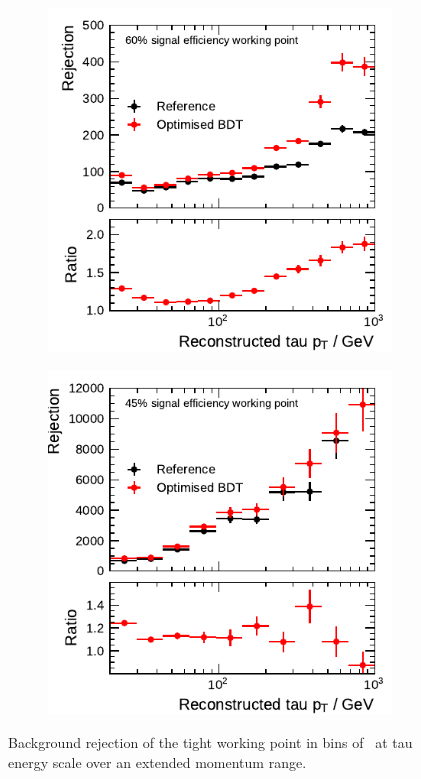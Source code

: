 \begin{figure}[htbp]
  \centering
  \begin{subfigure}[t]{0.48\textwidth}
    \centering
    \includegraphics{./figures/bdt_perf/post_optimisation/1p_highpt/rejection_tight_ratio_highpt.pdf}
  \end{subfigure}\hfill
  \begin{subfigure}[t]{0.48\textwidth}
    \centering
    \includegraphics{./figures/bdt_perf/post_optimisation/3p_highpt/rejection_tight_ratio_highpt.pdf}
  \end{subfigure}
  \caption[Background rejection of the tight working point in bins of
  \tauhadvis~\pt for the BDT-based identification after optimisation (extended
  \tauhadvis~\pt range)]{Background rejection of the tight working point in bins
    of \tauhadvis~\pt at tau energy scale over an extended momentum range.}
  \label{fig:rejection_highpt}
\end{figure}

